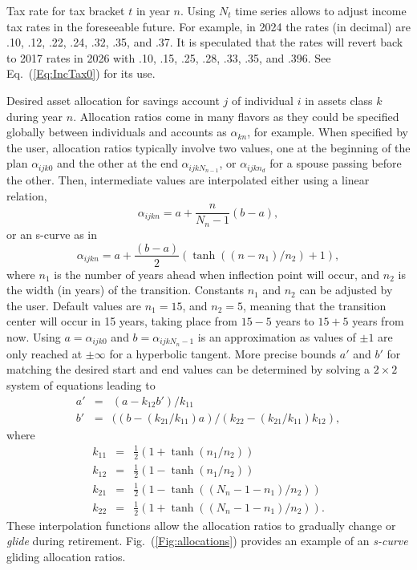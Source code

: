 \documentclass{report}[fleqn,12pt]
\begin{document}
\begin{description}[leftmargin=4em,style=multiline]
	Tax rate for tax bracket $t$ in year $n$. Using $N_t$ time series allows to adjust income
	tax rates in the foreseeable future.
	For example, in 2024 the rates (in decimal) are .10, .12, .22, .24, .32, .35, and .37.
	It is speculated that the rates will revert back to 2017 rates in 2026 with
	.10, .15, .25, .28, .33, .35, and .396. See Eq.~(\ref{Eq:IncTax0}) for its use.
\item [$\alpha_{ijkn}$]
	Desired asset allocation for savings account $j$ of individual $i$ in
	assets class $k$ during year $n$.
	Allocation ratios come in many flavors as they could be specified globally between
	individuals and accounts as $\alpha_{kn}$, for example.
	When specified by the user, allocation ratios typically involve two values, one at the
	beginning of the plan $\alpha_{ijk0}$ and the other at the end
	$\alpha_{ijkN_{n-1}}$, or $\alpha_{ijkn_d}$ for a spouse passing before the other.
        Then, intermediate values are interpolated either using
	a linear relation,
\begin{equation}
	\alpha_{ijkn} = a + \frac{n}{N_n - 1} (b - a),
\end{equation}
or an s-curve as in
\begin{equation}
	\alpha_{ijkn} = a + \frac{(b - a)}{2}
	(\tanh((n-n_1)/n_2) + 1),
\end{equation}
	where $n_1$ is the number of years ahead when inflection point will occur, and $n_2$ is the
	width (in years) of the transition. Constants $n_1$ and $n_2$ can be adjusted by the user.
	Default values are $n_1 = 15$, and $n_2 = 5$, meaning that the transition center will occur
	in 15 years, taking place from $15-5$ years to $15+5$ years from now.
	Using $a = \alpha_{ijk0}$ and $b = \alpha_{ijkN_n-1}$ is an approximation as values of $\pm 1$
	are only reached at $\pm \infty$ for a hyperbolic tangent.
	More precise bounds $a'$ and $b'$ for matching the desired start and end values
	can be determined by solving a $2\times 2$ system of equations leading to
	\begin{eqnarray}
		a' &=& (a - k_{12}b')/k_{11} \nonumber \\
		b' &=& ((b - (k_{21}/k_{11})a)/(k_{22} - (k_{21}/k_{11})k_{12}),
	\end{eqnarray}
	where
	\begin{eqnarray}
		k_{11} &=& \frac{1}{2}(1 + \tanh(n_1/n_2)) \nonumber \\
		k_{12} &=& \frac{1}{2}(1 - \tanh(n_1/n_2)) \nonumber \\
		k_{21} &=& \frac{1}{2}(1 - \tanh((N_n-1-n_1)/n_2)) \nonumber \\
		k_{22} &=& \frac{1}{2}(1 + \tanh((N_n-1-n_1)/n_2)).
	\end{eqnarray}
	These interpolation functions allow the allocation ratios to gradually change
	or {\em glide} during retirement. Fig.~(\ref{Fig:allocations}) provides an example
	of an {\em s-curve} gliding allocation ratios.


\end{description}
\end{document}
